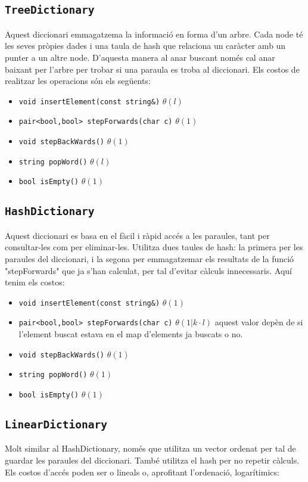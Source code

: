\documentclass{article}
\begin{document}
\subsection{\texttt{TreeDictionary}}
Aquest diccionari emmagatzema la informació en forma d'un arbre. Cada node té les seves pròpies dades i una taula de hash que relaciona un caràcter amb un punter a un altre node. D'aquesta manera al anar buscant només cal anar baixant per l'arbre per trobar si una paraula es troba al diccionari. Els costos de realitzar les operacions són els següents:

\begin{itemize}
	\item \verb|void insertElement(const string&)| $\theta(l)$
	\item \verb|pair<bool,bool> stepForwards(char c)| $\theta(1)$
	\item \verb|void stepBackWards()| $\theta(1)$
	\item \verb|string popWord()| $\theta(l)$
	\item \verb|bool isEmpty()| $\theta(1)$
\end{itemize}

\subsection{\texttt{HashDictionary}}
Aquest diccionari es basa en el fàcil i ràpid accés a les paraules, tant per consultar-les com per eliminar-les. Utilitza dues taules de hash: la primera per les paraules del diccionari, i la segona per emmagatzemar els resultats de la funció "stepForwards" que ja s'han calculat, per tal d'evitar càlculs innecessaris. Aquí tenim els costos:

\begin{itemize}
	\item \verb|void insertElement(const string&)| $\theta(1)$
	\item \verb|pair<bool,bool> stepForwards(char c)| $\theta(1 | k·l)$ aquest valor depèn de si l'element buscat estava en el map d'elements ja buscats o no.
	\item \verb|void stepBackWards()| $\theta(1)$
	\item \verb|string popWord()| $\theta(1)$
	\item \verb|bool isEmpty()| $\theta(1)$
\end{itemize}

\subsection{\texttt{LinearDictionary}}
Molt similar al HashDictionary, només que utilitza un vector ordenat per tal de guardar les paraules del diccionari. També utilitza el hash per no repetir càlculs. Els costos d'accés poden ser o lineals o, aprofitant l'ordenació, logarítimics:
\end{document}
